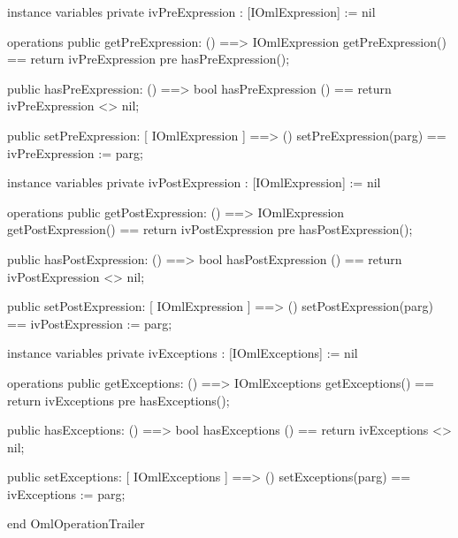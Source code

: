 \begin{vdm_al}
instance variables
  private ivPreExpression : [IOmlExpression] := nil

operations
  public getPreExpression: () ==> IOmlExpression
  getPreExpression() == return ivPreExpression
    pre hasPreExpression();

  public hasPreExpression: () ==> bool
  hasPreExpression () == return ivPreExpression <> nil;

  public setPreExpression: [ IOmlExpression ] ==> ()
  setPreExpression(parg) == ivPreExpression := parg;

instance variables
  private ivPostExpression : [IOmlExpression] := nil

operations
  public getPostExpression: () ==> IOmlExpression
  getPostExpression() == return ivPostExpression
    pre hasPostExpression();

  public hasPostExpression: () ==> bool
  hasPostExpression () == return ivPostExpression <> nil;

  public setPostExpression: [ IOmlExpression ] ==> ()
  setPostExpression(parg) == ivPostExpression := parg;

instance variables
  private ivExceptions : [IOmlExceptions] := nil

operations
  public getExceptions: () ==> IOmlExceptions
  getExceptions() == return ivExceptions
    pre hasExceptions();

  public hasExceptions: () ==> bool
  hasExceptions () == return ivExceptions <> nil;

  public setExceptions: [ IOmlExceptions ] ==> ()
  setExceptions(parg) == ivExceptions := parg;

end OmlOperationTrailer
\end{vdm_al}

